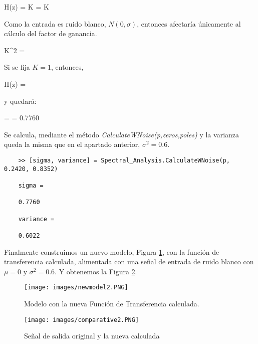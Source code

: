 \documentclass[a4paper, fontsize=11pt]{scrartcl} %
\numberwithin{equation}{section} %
\numberwithin{figure}{section} %
\numberwithin{table}{section} %
\newenvironment{myalign}{\par\nobreak\large\noindent\align}{\endalign} %
\begin{document}
	\begin{myalign}
			H(z) = K = K \\
	\end{myalign}
	
	Como la entrada es ruido blanco, $N(0,\sigma)$, entonces afectaría únicamente al cálculo  del factor de ganancia.
	
	\begin{myalign}
		K^2 \sigma = 
	\end{myalign}
	
	Si se fija $K = 1$, entonces,
	
	\begin{myalign}
		H(z) = 
	\end{myalign}
	
	y quedará:
	
	\begin{myalign}
		\sigma =  = 0.7760
	\end{myalign}
	
	Se calcula, mediante el método \textit{CalculateWNoise(p,zeros,poles)} y la varianza queda la misma que en el apartado anterior, $\sigma^2 = 0.6$.
	
	\begin{lstlisting}
	>> [sigma, variance] = Spectral_Analysis.CalculateWNoise(p, 0.2420, 0.8352)
	
	sigma =
	
	0.7760	
		
	variance =
	
	0.6022
	\end{lstlisting}
	
	Finalmente construimos un nuevo modelo, Figura  \ref{New Model 2}, con la función de transferencia calculada, alimentada con una señal de entrada de ruido blanco con $\mu = 0$ y $\sigma^2 = 0.6$. Y obtenemos la Figura \ref{Comparative Output 2}.
	
	\begin{figure}[h!]
		\centering
		\texttt{[image: images/newmodel2.PNG]}
		\caption{Modelo con la nueva Función de Transferencia calculada.}
		\label{New Model 2}
	\end{figure}
	\FloatBarrier
	
	\begin{figure}[h!]
		\centering
		\texttt{[image: images/comparative2.PNG]}
		\caption{Señal de salida original y la nueva calculada}
		\label{Comparative Output 2}
	\end{figure}
	\FloatBarrier
	
\end{document}
